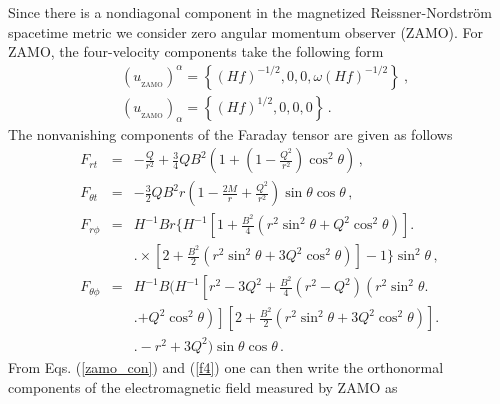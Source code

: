 \documentclass[showpacs,twocolumn,superscriptaddress]{revtex4}
\begin{document}
Since there is a nondiagonal component in the magnetized
Reissner-Nordstr\"{o}m spacetime metric we consider zero angular momentum observer (ZAMO). For ZAMO, the four-velocity components take the following form
%
%
\begin{eqnarray}
\label{zamo_con} &(u_{_{\textrm{ZAMO}}})^{\alpha}
=\left\{(Hf)^{-1/2},0,0,\omega(Hf)^{-1/2}\right\}\
, \\
\label{zamo_cov} &(u_{_{\textrm{ZAMO}}})_{\alpha}=
\left\{(Hf)^{1/2},0,0,0\right\}\, .
\end{eqnarray}
%
The nonvanishing components of the Faraday tensor are given as
follows
%
\begin{eqnarray}
%
\label{f1} F_{rt}&=&-\frac{Q}{r^2}+\frac{3}{4}QB^2\left( 1+\left(1-\frac{Q^2}{r^2}\right)\cos^2\theta\right)\, ,\\
%
\label{f2} F_{\theta t}&=&-\frac{3}{2}QB^2r\left(1-\frac{2M}{r}+\frac{Q^2}{r^2}\right)\sin\theta\cos\theta\, ,  \\
%
\label{f3}
F_{r\phi}&=&H^{-1}Br\bigg\{H^{-1}\left[1+\frac{B^2}{4}\left(r^2\sin^2\theta
+
Q^2\cos^2\theta\right)\right]\bigg.\nonumber\\
%
&&\bigg.\times
\left[2+\frac{B^2}{2}\left(r^2\sin^2\theta
+ 3Q^2\cos^2\theta\right)\right]-1\bigg\}\sin^2\theta\, , \\
%
\label{f4} 
F_{\theta
\phi}&=&H^{-1}B\bigg(H^{-1}\left[r^2-3Q^2+\frac{B^2}{4}\left(
r^2-Q^2\right)\left(r^2\sin^2\theta \bigg.\right.\right. \nonumber\\
%
&&\bigg.\left.\left.
+ Q^2\cos^2\theta\right)\right]
%
\left[2+\frac{B^2}{2}\left(r^2\sin^2\theta +
3Q^2\cos^2\theta\right)\right]
\bigg.\nonumber\\
%
&&\bigg.-r^2+3Q^2\bigg) \sin\theta\cos\theta\,.
%
\end{eqnarray}
%
From Eqs. %
(\ref{zamo_con}) and (\ref{f4}) %
one can then write the orthonormal components of the electromagnetic field measured by ZAMO as 
%
\end{document}
